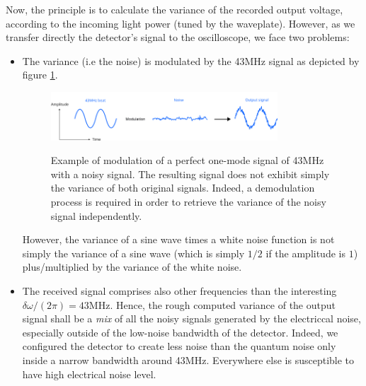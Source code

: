 \documentclass[10pt]{report}
\begin{document}
Now, the principle is to calculate the variance of the recorded output voltage, according to the incoming light power (tuned by the waveplate). However, as we transfer directly the detector's signal to the oscilloscope, we face two problems:
\begin{itemize}
	\item The variance (i.e the noise) is modulated by the 43MHz signal as depicted by figure \ref{fig:beatnoise}.
	
	\begin{figure}[h!]
	\caption{Example of modulation of a perfect one-mode signal of 43MHz with a noisy signal. The resulting signal does not exhibit simply the variance of both original signals. Indeed, a demodulation process is required in order to retrieve the variance of the noisy signal independently.}
	\centering
	\includegraphics[width=0.8\textwidth]{beatnoise}
	\label{fig:beatnoise}
	\end{figure}
	
	However, the variance of a sine wave times a white noise function is not simply the variance of a sine wave (which is simply $1/2$ if the amplitude is $1$) plus/multiplied by the variance of the white noise.
	\item The received signal comprises also other frequencies than the interesting $\delta\omega/(2\pi) = 43$MHz. Hence, the rough computed variance of the output signal shall be a \textit{mix} of all the noisy signals generated by the electriccal noise, especially outside of the low-noise bandwidth of the detector. Indeed, we configured the detector to create less noise than the quantum noise only inside a narrow bandwidth around 43MHz. Everywhere else is susceptible to have high electrical noise level.
\end{itemize}
\end{document}
